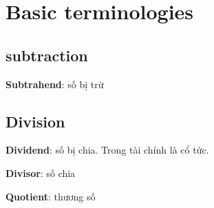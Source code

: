 \chapter{Basic terminologies}

\section{subtraction}

\textbf{Subtrahend}: số bị trừ

\section{Division}

\textbf{Dividend}: số bị chia. Trong tài chính là cổ tức.

\textbf{Divisor}: số chia

\textbf{Quotient}: thương số
